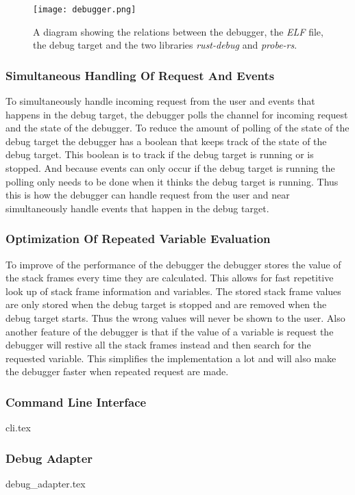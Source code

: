 \begin{figure}[h]
	\centering
	\texttt{[image: debugger.png]}
	\caption{A diagram showing the relations between the debugger, the \emph{ELF} file, the debug target and the two libraries \emph{rust-debug} and \emph{probe-rs}.}
	\label{fig:debugger}
\end{figure}


\subsubsection{Simultaneous Handling Of Request And Events}
To simultaneously handle incoming request from the user and events that happens in the debug target, the debugger polls the channel for incoming request and the state of the debugger.
To reduce the amount of polling of the state of the debug target the debugger has a boolean that keeps track of the state of the debug target.
This boolean is to track if the debug target is running or is stopped.
And because events can only occur if the debug target is running the polling only needs to be done when it thinks the debug target is running.
Thus this is how the debugger can handle request from the user and near simultaneously handle events that happen in the debug target.


\subsubsection{Optimization Of Repeated Variable Evaluation}
To improve of the performance of the debugger the debugger stores the value of the stack frames every time they are calculated.
This allows for fast repetitive look up of stack frame information and variables.
The stored stack frame values are only stored when the debug target is stopped and are removed when the debug target starts.
Thus the wrong values will never be shown to the user.
Also another feature of the debugger is that if the value of a variable is request the debugger will restive all the stack frames instead and then search for the requested variable.
This simplifies the implementation a lot and will also make the debugger faster when repeated request are made.


\subsubsection{Command Line Interface}
{cli.tex}


\subsubsection{Debug Adapter}
{debug_adapter.tex}

